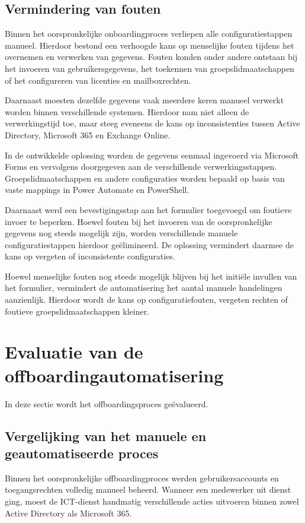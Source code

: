 \subsection{Vermindering van fouten}

Binnen het oorspronkelijke onboardingproces verliepen alle configuratiestappen manueel. Hierdoor bestond een verhoogde kans op menselijke fouten tijdens het overnemen en verwerken van gegevens. Fouten konden onder andere ontstaan bij het invoeren van gebruikersgegevens, het toekennen van groepslidmaatschappen of het configureren van licenties en mailboxrechten.

Daarnaast moesten dezelfde gegevens vaak meerdere keren manueel verwerkt worden binnen verschillende systemen. Hierdoor nam niet alleen de verwerkingstijd toe, maar steeg eveneens de kans op inconsistenties tussen Active Directory, Microsoft 365 en Exchange Online.

In de ontwikkelde oplossing worden de gegevens eenmaal ingevoerd via Microsoft Forms en vervolgens doorgegeven aan de verschillende verwerkingsstappen. Groepslidmaatschappen en andere configuraties worden bepaald op basis van vaste mappings in Power Automate en PowerShell.

Daarnaast werd een bevestigingsstap aan het formulier toegevoegd om foutieve invoer te beperken. Hoewel fouten bij het invoeren van de oorspronkelijke gegevens nog steeds mogelijk zijn, worden verschillende manuele configuratiestappen hierdoor geëlimineerd. De oplossing vermindert daarmee de kans op vergeten of inconsistente configuraties.

Hoewel menselijke fouten nog steeds mogelijk blijven bij het initiële invullen van het formulier, vermindert de automatisering het aantal manuele handelingen aanzienlijk. Hierdoor wordt de kans op configuratiefouten, vergeten rechten of foutieve groepslidmaatschappen kleiner.

\section{Evaluatie van de offboardingautomatisering}

In deze sectie wordt het offboardingsproces geëvalueerd.

\subsection{Vergelijking van het manuele en geautomatiseerde proces}

Binnen het oorspronkelijke offboardingproces werden gebruikersaccounts en toegangsrechten volledig manueel beheerd. Wanneer een medewerker uit dienst ging, moest de ICT-dienst handmatig verschillende acties uitvoeren binnen zowel Active Directory als Microsoft 365.

